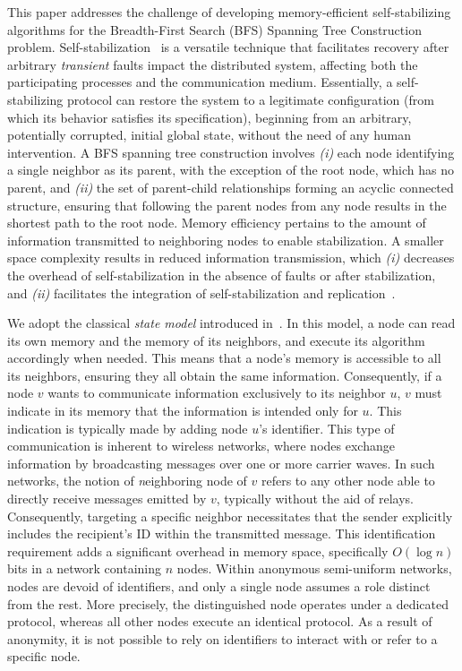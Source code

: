 \documentclass[a4paper, 12pt]{article}
\begin{document}
This paper addresses the challenge of developing memory-efficient self-stabilizing algorithms for the Breadth-First Search (BFS) Spanning Tree Construction problem.
Self-stabilization~\cite{ADDP19,D74,D00,H22} is a versatile technique that facilitates recovery after arbitrary \textit{transient} faults impact the distributed system, affecting both the participating processes and the communication medium. Essentially, a self-stabilizing protocol can restore the system to a legitimate configuration (from which its behavior satisfies its specification), beginning from an arbitrary, potentially corrupted, initial global state, without the need of any human intervention.
A BFS spanning tree construction involves \textit{(i)} each node identifying a single neighbor as its parent, with the exception of the root node, which has no parent, and \textit{(ii)} the set of parent-child relationships forming an acyclic connected structure, ensuring that following the parent nodes from any node results in the shortest path to the root node.
Memory efficiency pertains to the amount of information transmitted to neighboring nodes to enable stabilization. A smaller space complexity results in reduced information transmission, which \textit{(i)} decreases the overhead of self-stabilization in the absence of faults or after stabilization, and \textit{(ii)} facilitates the integration of self-stabilization and replication~\cite{GCH06,HP00}.

We adopt the classical \textit{state model} introduced in~\cite{D74}.
In this model, a node can read its own memory and the memory of its neighbors, and execute its algorithm accordingly when needed. This means that a node's memory is accessible to all its neighbors, ensuring they all obtain the same information. 
Consequently, if a node $v$ wants to communicate information exclusively to its neighbor $u$, $v$ must indicate in its memory that the information is intended only for $u$. This indication is typically made by adding node $u$'s identifier.
This type of communication is inherent to wireless networks, where nodes exchange information by broadcasting messages over one or more carrier waves. In such networks, the notion of {\emph neighboring node} of $v$ refers to any other node able to directly receive messages emitted by $v$, typically without the aid of relays.  Consequently, targeting a specific neighbor necessitates that the sender explicitly includes the recipient's ID within the transmitted message. This identification requirement adds a significant overhead in memory space, specifically $O(\log n)$ bits in a network containing $n$ nodes. Within anonymous semi-uniform networks, nodes are devoid of identifiers, and only a single node assumes a role distinct from the rest. More precisely, the distinguished node operates under a dedicated protocol, whereas all other nodes execute an identical protocol. As a result of anonymity, it is not possible to rely on identifiers to interact with or refer to a specific node.
\end{document}
